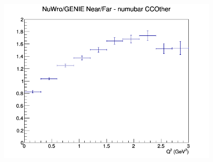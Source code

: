 \begin{figure}[h]
\endminipage
{}
\includegraphics[width=\linewidth]{Q2/nominal/ratios/CCOther_NuWro_GENIE_numubar_NF_Q2.png}
\endminipage
\newline
\end{figure}
\clearpage
